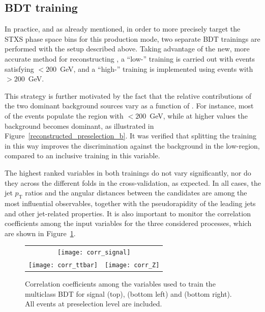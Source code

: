 \subsection{BDT training}

In practice, and as already mentioned, in order to more precisely target the STXS phase space bins for this \ttH production mode, two separate BDT trainings are performed with the setup described above. Taking advantage of the new, more accurate method for reconstructing \pth, a ``low-\pth'' training is carried out with events satisfying \pth$<200$~GeV, and a ``high-\pth'' training is implemented using events with \pth$>200$~GeV.  

This strategy is further motivated by the fact that the relative contributions of the two dominant background sources vary as a function of \pth. For instance, most of the \ttbar events populate the region with \pth$<200$~GeV, while at higher values the \ztautau background becomes dominant, as illustrated in Figure~\ref{reconstructed_preselection_b}. It was verified that splitting the training in this way improves the discrimination against the \ttbar background in the low-\pth region, compared to an inclusive training in this variable.

The highest ranked variables in both trainings do not vary significantly, nor do they across the different folds in the cross-validation, as expected. In all cases, the jet $p_{\text{T}}$ ratios and the angular distances between the \tauhadvis candidates are among the most influential observables, together with the pseudorapidity of the leading jets and other jet-related properties. It is also important to monitor the correlation coefficients among the input variables for the three considered processes, which are shown in Figure~\ref{tth_vars_corr}.
\begin{figure}[htbp]
  \centering
  \setlength{\tabcolsep}{2pt}
  \renewcommand{\arraystretch}{0}

  \begin{tabular}{@{}c c@{}}
    \multicolumn{2}{c}{\texttt{[image: corr\_signal]}} \\[6pt]
    \texttt{[image: corr\_ttbar]} &
    \texttt{[image: corr\_Z]}
  \end{tabular}

  \caption{Correlation coefficients among the variables used to train the multiclass BDT for signal (top), \ttbar (bottom left) and \ztautau (bottom right). All events at preselection level are included.}
  \label{tth_vars_corr}
\end{figure}

